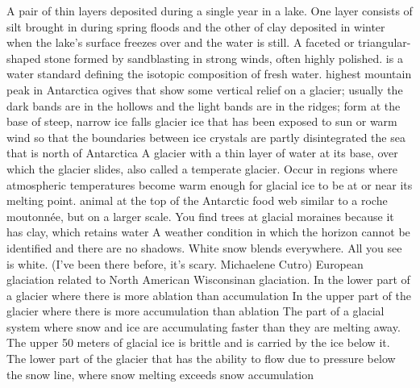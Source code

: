  A pair of thin layers deposited during a single year in a lake. One layer consists of silt brought in during spring floods and the other of clay deposited in winter when the lake's surface freezes over and the water is still.
 A faceted or triangular-shaped stone formed by sandblasting in strong winds, often highly polished.
 is a water standard defining the isotopic composition of fresh water.
 highest mountain peak in Antarctica
 ogives that show some vertical relief on a glacier; usually the dark bands are in the hollows and the light bands are in the ridges; form at the base of steep, narrow ice falls
 glacier ice that has been exposed to sun or warm wind so that the boundaries between ice crystals are partly disintegrated
 the sea that is north of Antarctica
 A glacier with a thin layer of water at its base, over which the glacier slides, also called a temperate glacier. Occur in regions where atmospheric temperatures become warm enough for glacial ice to be at or near its melting point.
 animal at the top of the Antarctic food web
 similar to a roche moutonnée, but on a larger scale.
 You find trees at glacial moraines because it has clay, which retains water
 A weather condition in which the horizon cannot be identified and there are no shadows. White snow blends everywhere. All you see is white. (I've been there before, it's scary. Michaelene Cutro)
 European glaciation related to North American Wisconsinan glaciation.
 In the lower part of a glacier where there is more ablation than accumulation
 In the upper part of the glacier where there is more accumulation than ablation
 The part of a glacial system where snow and ice are accumulating faster than they are melting away.
 The upper 50 meters of glacial ice is brittle and is carried by the ice below it.
 The lower part of the glacier that has the ability to flow due to pressure
 below the snow line, where snow melting exceeds snow accumulation
